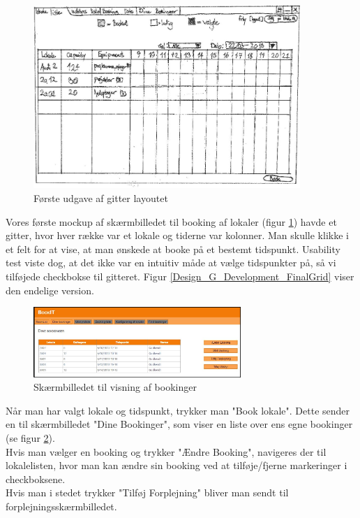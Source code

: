 \begin{figure}[h!]
  \centering
    \includegraphics[width=0.9\textwidth]{Appendix/GUI-Prototype/PaperMockup/LokaleListe_001}
  \caption{Første udgave af gitter layoutet}
\label{Design_G_Development_FirstGrid}
\end{figure}

Vores første mockup af skærmbilledet til booking af lokaler (figur \ref{Design_G_Development_FirstGrid}) havde et gitter, hvor hver række var et lokale og tiderne var kolonner. Man skulle klikke i et felt for at vise, at man ønskede at booke på et bestemt tidspunkt. Usability test viste dog, at det ikke var en intuitiv måde at vælge tidspunkter på, så vi tilføjede checkbokse til gitteret.
Figur \ref{Design_G_Development_FinalGrid} viser den endelige version.

\begin{figure}[h!]
  \centering
    \includegraphics[width=0.7\textwidth]{Appendix/GUI-Prototype/DigitalMockup/DineBookinger}
  \caption{Skærmbilledet til visning af bookinger}
\label{Design_G_Development_YourBookings_Final}
\end{figure} 

Når man har valgt lokale og tidspunkt, trykker man "Book lokale". Dette sender en til skærmbilledet "Dine Bookinger", som viser en liste over ens egne bookinger (se figur \ref{Design_G_Development_YourBookings_Final}). 
\\Hvis man vælger en booking og trykker "Ændre Booking", navigeres der til lokalelisten, hvor man kan ændre sin booking ved at tilføje/fjerne markeringer i checkboksene. 
\\Hvis man i stedet trykker "Tilføj Forplejning" bliver man sendt til forplejningsskærmbilledet.

